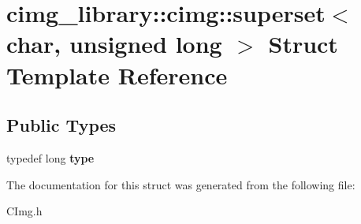 \hypertarget{structcimg__library_1_1cimg_1_1superset_3_01char_00_01unsigned_01long_01_4}{\section{cimg\-\_\-library\-:\-:cimg\-:\-:superset$<$ char, unsigned long $>$ Struct Template Reference}
\label{structcimg__library_1_1cimg_1_1superset_3_01char_00_01unsigned_01long_01_4}
}
\subsection*{Public Types}
\begin{DoxyCompactItemize}
\item 
\hypertarget{structcimg__library_1_1cimg_1_1superset_3_01char_00_01unsigned_01long_01_4_af0626ad06e5dc4d85fbc72baaec5ec7a}{typedef long {\bfseries type}}\label{structcimg__library_1_1cimg_1_1superset_3_01char_00_01unsigned_01long_01_4_af0626ad06e5dc4d85fbc72baaec5ec7a}

\end{DoxyCompactItemize}


The documentation for this struct was generated from the following file\-:\begin{DoxyCompactItemize}
\item 
C\-Img.\-h\end{DoxyCompactItemize}

